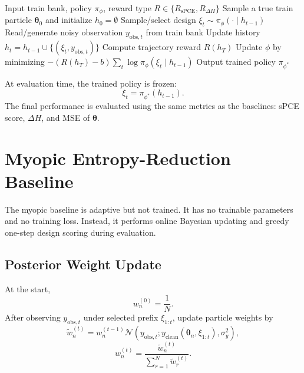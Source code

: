 \documentclass[11pt]{article}
\newcommand{\thetaVec}{\bm{\theta}}
\newcommand{\Normal}{\mathcal{N}}
\begin{document}
\begin{algorithm}[H]
\caption{DAD Training with sPCE or $\Delta H$ Reward}
\begin{algorithmic}[1]
\State Input train bank, policy $\pi_\phi$, reward type $R\in\{R_{\mathrm{sPCE}},R_{\Delta H}\}$
    \State Sample a true train particle $\thetaVec_0$ and initialize $h_0=\emptyset$
        \State Sample/select design $\xi_t\sim\pi_\phi(\cdot\mid h_{t-1})$
        \State Read/generate noisy observation $y_{\mathrm{obs},t}$ from train bank
        \State Update history $h_t=h_{t-1}\cup\{(\xi_t,y_{\mathrm{obs},t})\}$
    \EndFor
    \State Compute trajectory reward $R(h_T)$
    \State Update $\phi$ by minimizing $-(R(h_T)-b)\sum_t \log\pi_\phi(\xi_t\mid h_{t-1})$
\EndFor
\State Output trained policy $\pi_{\phi^*}$
\end{algorithmic}
\end{algorithm}

At evaluation time, the trained policy is frozen:
\begin{equation}
 \xi_t=\pi_{\phi^*}(h_{t-1}).
\end{equation}
The final performance is evaluated using the same metrics as the baselines: sPCE score, $\Delta H$, and MSE of $\thetaVec$.

\section{Myopic Entropy-Reduction Baseline}

The myopic baseline is adaptive but not trained. It has no trainable parameters and no training loss. Instead, it performs online Bayesian updating and greedy one-step design scoring during evaluation.

\subsection{Posterior Weight Update}

At the start,
\begin{equation}
 w_n^{(0)}=\frac{1}{N}.
\end{equation}
After observing $y_{\mathrm{obs},t}$ under selected prefix $\xi_{1:t}$, update particle weights by
\begin{equation}
 \tilde w_n^{(t)}
 =
 w_n^{(t-1)}
 \Normal\!\left(
 y_{\mathrm{obs},t};
 y_{\mathrm{clean}}(\thetaVec_n,\xi_{1:t}),
 \sigma_y^2
 \right),
\end{equation}
\begin{equation}
 w_n^{(t)}
 =
 \frac{\tilde w_n^{(t)}}{\sum_{r=1}^{N}\tilde w_r^{(t)}}.
\end{equation}
\end{document}
